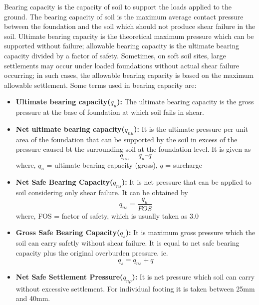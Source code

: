 Bearing capacity is the capacity of soil to support the loads applied to the ground. The bearing capacity of soil is the maximum average contact pressure between the foundation and the soil which should not produce shear failure in the soil. Ultimate bearing capacity is the theoretical maximum pressure which can be supported without failure; allowable bearing capacity is the ultimate bearing capacity divided by a factor of safety. Sometimes, on soft soil sites, large settlements may occur under loaded foundations without actual shear failure occurring; in such cases, the allowable bearing capacity is based on the maximum allowable settlement. Some terms used in bearing capacity are:
\begin{itemize}
\item \textbf{Ultimate bearing capacity($q_u$):} The ultimate bearing capacity is the gross pressure at the base of foundation at which soil fails in shear.

\item \textbf{Net ultimate bearing capacity($q_{nu}$):} It is the ultimate pressure per unit area of the foundation that can be supported by the soil in excess of the pressure caused bt the surrounding soil at the foundation level. It is given as
\begin{equation}
q_{nu} = q_u – q
\end{equation}
where, $q_u$ = ultimate bearing capacity (gross), $q$ = surcharge

\item \textbf{Net Safe Bearing Capacity($q_{ns}$):} It is net pressure that can be applied to soil considering only shear failure. It can be obtained by
\begin{equation}
q_{ns} = \frac{q_u}{FOS}
\end{equation}
where, FOS = factor of safety, which is usually taken as 3.0

\item \textbf{Gross Safe Bearing Capacity($q_{s}$):} It is maximum gross pressure which the soil can carry safetly without shear failure. It is equal to net safe bearing capacity plus the original overburden pressure. ie.
\begin{equation}
q_s = q_{ns} + q
\end{equation}

\item \textbf{Net Safe Settlement Pressure($q_{n\rho}$):} It is net pressure which soil can carry without excessive settlement. For individual footing it is taken between 25mm and 40mm.


\end{itemize}
